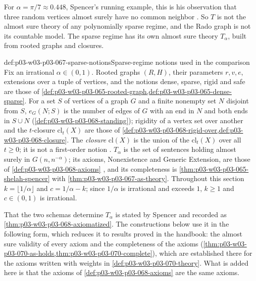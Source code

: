 For \(\alpha=\pi/7\approx0.448\), Spencer's running example, this is his
observation that three random vertices almost surely have no common neighbor
\cite[pp.~7--8]{Spencer2007LogicRandomStructuresAuthor}.  So \(T\) is not
the almost sure theory of any polynomially sparse regime, and the Rado graph
is not its countable model.  The sparse regime has its own almost sure
theory \(T_\alpha\), built from rooted graphs and closures.

\begin{hbconvention}{def:p03-w03-p03-067-sparse-notions}{Sparse-regime notions used in the comparison}
Fix an irrational \(\alpha\in(0,1)\).  Rooted graphs \((R,H)\), their
parameters \(r,v,e\), extensions over a tuple of vertices, and the notions
dense, sparse, rigid and safe are those of
\cref{def:p03-w03-p03-065-rooted-graph,def:p03-w03-p03-065-dense-sparse}.
For a set \(S\) of vertices of a graph \(G\) and a finite nonempty set \(N\)
disjoint from \(S\), \(e_G(N;S)\) is the number of edges of \(G\) with an end
in \(N\) and both ends in \(S\cup N\) (\cref{def:p03-w03-p03-068-standing});
rigidity of a vertex set over another and the \(t\)-closure
\(\mathrm{cl}_t(X)\) are those of
\cref{def:p03-w03-p03-068-rigid-over,def:p03-w03-p03-068-closure}.  The
\emph{closure} \(\mathrm{cl}(X)\) is the union of the \(\mathrm{cl}_t(X)\)
over all \(t\geq0\); it is not a first-order notion
\cite[pp.~14--15]{Spencer2007LogicRandomStructuresAuthor}.  \(T_\alpha\) is
the set of sentences holding almost surely in \(G(n,n^{-\alpha})\); its
axioms, Nonexistence and Generic Extension, are those of
\cref{def:p03-w03-p03-068-axioms} \cite[p.~10]{Spencer2007LogicRandomStructuresAuthor},
and its completeness is \cref{thm:p03-w03-p03-065-shelah-spencer} with
\cref{thm:p03-w03-p03-067-as-theory}.  Throughout this section
\(k=\lfloor1/\alpha\rfloor\) and \(c=1/\alpha-k\); since \(1/\alpha\) is
irrational and exceeds \(1\), \(k\geq1\) and \(c\in(0,1)\) is irrational.
\end{hbconvention}

That the two schemas determine \(T_\alpha\) is stated by Spencer and recorded
as \cref{thm:p03-w03-p03-068-axiomatized}.  The constructions below use it
in the following form, which reduces it to results proved in the handbook:
the almost sure validity of every axiom and the completeness of the axioms
(\cref{thm:p03-w03-p03-070-as-holds,thm:p03-w03-p03-070-complete}), which
are established there for the axioms written with weights in
\cref{def:p03-w03-p03-070-theory}.  What is added here is that the axioms of
\cref{def:p03-w03-p03-068-axioms} are the same axioms.


